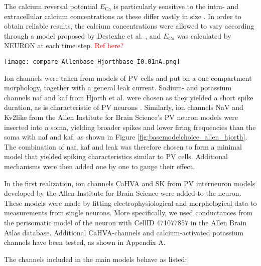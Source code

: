 \documentclass[times, twoside]{zHenriquesLab-StyleBioRxiv}
\begin{document}
The calcium reversal potential $E_{\text{Ca}}$ is particularly sensitive to the intra- and extracellular calcium concentrations as these differ vastly in size \cite{sterratt_principles_2011}. In order to obtain reliable results, the calcium concentrations were allowed to vary according through a model proposed by Destexhe et al. \cite{destexhe_synthesis_1994}, and $E_{\text{Ca}}$ was calculated by NEURON at each time step. \textcolor{red}{Ref here?}

\begin{figure*}
\centering
\texttt{[image: compare\_Allenbase\_Hjorthbase\_I0.01nA.png]}
\caption{Firing behavior of minimal models of PV-cells. A) Voltage traces for input current $I$ = 0.01 nA. B) $f-I$ curve for the minimal models. Hjorth et. al. - naf, kaf and pas, Allen Institute - NaV, Kv2like and pas.}
\label{fig:basemodelchoice_allen_hjorth}
\end{figure*}


Ion channels were taken from models of PV cells and put on a one-compartment morphology, together with a general leak current. Sodium- and potassium channels naf and kaf from Hjorth et al. \cite{hjorth_microcircuits_2020} were chosen as they yielded a short spike duration, as is characteristic of PV neurons \cite{bartos_functional_2012}. Similarly, ion channels NaV and Kv2like from the Allen Institute for Brain Science's PV neuron models were inserted into a soma, yielding broader spikes and lower firing frequencies than the soma with naf and kaf, as shown in Figure \ref{fig:basemodelchoice_allen_hjorth}. The combination of naf, kaf and leak was therefore chosen to form a minimal model that yielded spiking characteristics similar to PV cells. Additional mechanisms were then added one by one to gauge their effect.

In the first realization, ion channels CaHVA and SK from PV interneuron models developed by the Allen Institute for Brain Science were added to the neuron. These models were made by fitting electrophysiological and morphological data to measurements from single neurons. More specifically, we used conductances from the perisomatic model of the neuron with CellID 471077857 in the Allen Brain Atlas database. Additional CaHVA-channels and calcium-activated potassium channels have been tested, as shown in Appendix A. %

The channels included in the main models behave as listed:
\end{document}

